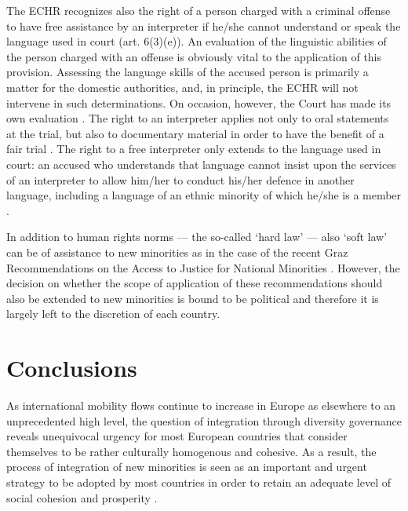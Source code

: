 \documentclass[output=paper,colorlinks,citecolor=brown]{langscibook}
\begin{document}
The ECHR recognizes also the right of a person charged with a criminal offense to have free assistance by an interpreter if he/she cannot understand or speak the language used in court (art.  6(3)(e)). An evaluation of the linguistic abilities of the person charged with an offense is obviously vital to the application of this provision. Assessing the language skills of the accused person is primarily a matter for the domestic authorities, and, in principle, the ECHR will not intervene in such determinations. On occasion, however, the Court has made its own evaluation \citep{ecthr2010_katritsch}. The right to an interpreter applies not only to oral statements at the trial, but also to documentary material in order to have the benefit of a fair trial \citep{schabas2015,ovey_white2006}. The right to a free interpreter only extends to the language used in court: an accused who understands that language cannot insist upon the services of an interpreter to allow him/her to conduct his/her defence in another language, including a language of an ethnic minority of which he/she is a member \citep{ecommhr_zamir1983,ecommhr_bideault1986,ecthr2003_lagerblom}.

In addition to human rights norms --- the so-called `hard law' --- also `soft law' can be of assistance to new minorities as in the case of the recent Graz Recommendations on the Access to Justice for National Minorities \citep{osce_hcnm2017}. However, the decision on whether the scope of application of these recommendations should also be extended to new minorities is bound to be political and therefore it is largely left to the discretion of each country.

\section{Conclusions}\label{ch2.4.ss.5}

As international mobility flows continue to increase in Europe as elsewhere to an unprecedented high level, the question of integration through diversity governance reveals unequivocal urgency for most European countries that consider themselves to be rather culturally homogenous and cohesive. As a result, the process of integration of new minorities is seen as an important and urgent strategy to be adopted by most countries in order to retain an adequate level of social cohesion and prosperity \citep{collett_petrovic2014}.
\end{document}
